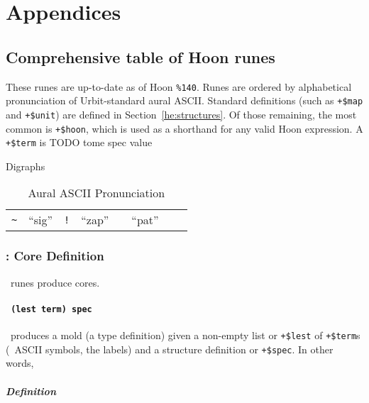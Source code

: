 \setchapterpreamble[u]{\margintoc}
\chapter{Appendices}


\section{Comprehensive table of Hoon runes}

These runes are up-to-date as of Hoon \texttt{\%140}.  Runes are ordered by alphabetical pronunciation of Urbit-standard aural ASCII.  Standard definitions (such as \texttt{+\$map} and \texttt{+\$unit}) are defined in Section~\ref{he:structures}.  Of those remaining, the most common is \texttt{+\$hoon}, which is used as a shorthand for any valid Hoon expression.  A \texttt{+\$term} is TODO tome spec value

Digraphs

\begin{table}[h]
  \caption{Aural ASCII Pronunciation}
  \label{}
  \begin{tabular}{clclclcl}
    \texttt{\textasciitilde} & “sig” &
    \texttt{!} & “zap” &
    \texttt{\@} & “pat” \\
  \end{tabular}
\end{table}

\subsection{\pbar:  Core Definition}

\pbar~runes produce cores.

\subsubsection{\barbuc\texttt{~(lest term) spec}} %
\label{ap:barbuc}

\pbarbuc~produces a mold (a type definition) given a non-empty list or \texttt{+\$lest} of \texttt{+\$term}s (\pattas~ASCII symbols, the labels) and a structure definition or \texttt{+\$spec}.  In other words, \barbuc~

\paragraph{Definition}



